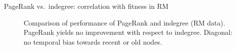 \begin{frame}{PageRank vs.\ indegree: correlation with fitness in RM}
\begin{figure}
    \caption{Comparison of performance of PageRank and indegree (RM data). \newline
    PageRank yields no improvement with respect to indegree. \newline
    Diagonal: no temporal bias towards recent or old nodes.}
\end{figure}
\end{frame}

